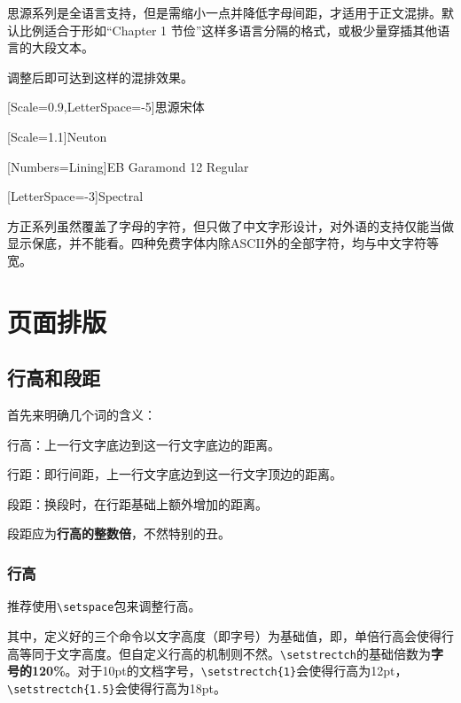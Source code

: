 \documentclass[10pt,openany]{book}
\begin{document}
思源系列是全语言支持，但是需缩小一点并降低字母间距，才适用于正文混排。默认比例适合于形如“Chapter 1 节俭”这样多语言分隔的格式，或极少量穿插其他语言的大段文本。

调整后即可达到这样的混排效果。

\begin{adjustwidth}{2em}{2em}
    \blankpar

    [Scale=0.9,LetterSpace=-5]思源宋体\testtext

    [Scale=1.1]Neuton\testtext

    [Numbers=Lining]EB Garamond 12 Regular\testtext

    [LetterSpace=-3]Spectral\testtext

    \blankpar
\end{adjustwidth}

方正系列虽然覆盖了字母的字符，但只做了中文字形设计，对外语的支持仅能当做显示保底，并不能看。四种免费字体内除ASCII外的全部字符，均与中文字符等宽。

\chapter{页面排版}

\section{行高和段距}

首先来明确几个词的含义：

行高：上一行文字底边到这一行文字底边的距离。

行距：即行间距，上一行文字底边到这一行文字顶边的距离。

段距：换段时，在行距基础上额外增加的距离。

段距应为\textbf{行高的整数倍}，不然特别的丑。

\subsection{行高}

推荐使用\texttt{\textbackslash{}setspace}包来调整行高。



其中，定义好的三个命令以文字高度（即字号）为基础值，即，单倍行高会使得行高等同于文字高度。但自定义行高的机制则不然。\texttt{\textbackslash{}setstrectch}的基础倍数为\textbf{字号的120\%}。对于10pt的文档字号，\texttt{\textbackslash{}setstrectch\{1\}}会使得行高为12pt，\texttt{\textbackslash{}setstrectch\{1.5\}}会使得行高为18pt。
\end{document}
